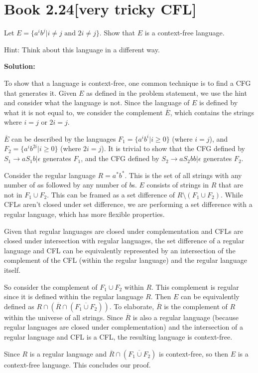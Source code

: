 \documentclass[11pt]{article}
\newcommand\union{\cup}
\newcommand\intersect{\cap}
\newenvironment{question}[2]
{\newpage\section{#1\texorpdfstring{\hfill}{horizontal spacing}{\rm\normalsize #2}}}{}
\newenvironment{solution}
{\textbf{Solution: }\color{blue}}
{\color{black}}
\begin{document}
\begin{question}{Book 2.24}{[very tricky CFL]}

Let \(E = \{ a^i b^j | i \neq j \text{ and } 2i \neq j \}\). Show that \(E\) is a context-free language.

Hint: Think about this language in a different way.

\begin{solution}

To show that a language is context-free, one common technique is to find a CFG that generates it. Given \(E\) as defined in the problem statement, we use the hint and consider what the language is not. Since the language of \(E\) is defined by what it is not equal to, we consider the complement \(\overline{E}\), which contains the strings where \(i = j\) or \(2i = j\).

\(\overline{E}\) can be described by the languages \(F_1 = \{a^i b^i | i \geq 0\}\) (where \(i=j\)), and \(F_2 = \{a^i b^{2i} | i \geq 0\}\) (where \(2i=j\)). It is trivial to show that the CFG defined by \(S_1 \rightarrow a S_1 b | \epsilon\) generates \(F_1\), and the CFG defined by \(S_2 \rightarrow a S_2 bb | \epsilon\) generates \(F_2\).

Consider the regular language \(R=a^* b^*\). This is the set of all strings with any number of \(a\)s followed by any number of \(b\)s. \(E\) consists of strings in \(R\) that are not in \(F_1 \union F_2\). This can be framed as a set difference of \(R \setminus (F_1 \union F_2)\). While CFLs aren't closed under set difference, we are performing a set difference with a regular language, which has more flexible properties.

Given that regular languages are closed under complementation and CFLs are closed under intersection with regular languages, the set difference of a regular language and CFL can be equivalently represented by an intersection of the complement of the CFL (within the regular language) and the regular language itself.

So consider the complement of \(F_1 \union F_2\) within \(R\). This complement is regular since it is defined within the regular language \(R\). Then \(E\) can be equivalently defined as \(R \intersect (\overline{R} \intersect (\overline{F_1 \union F_2}))\). To elaborate, \(\overline{R}\) is the complement of \(R\) within the universe of all strings. Since \(\overline{R}\) is also a regular language (because regular languages are closed under complementation) and the intersection of a regular language and CFL is a CFL, the resulting language is context-free.

Since \(R\) is a regular language and \(\overline{R} \intersect (\overline{F_1 \union F_2})\) is context-free, so then \(E\) is a context-free language. This concludes our proof.

\end{solution}
\end{question}
\end{document}
